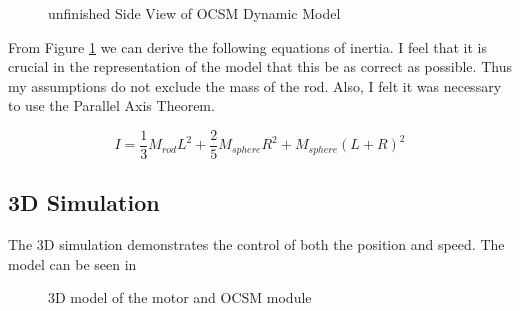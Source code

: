 \begin{figure}[H]
\centering
{}
\caption{\label{fig:dynamic_side} unfinished Side View of OCSM Dynamic Model}
\end{figure}

From Figure {\ref{fig:dynamic_side}} we can derive the following equations of inertia. I feel that it is crucial in the representation of the model that this be as correct as possible. Thus my assumptions do not exclude the mass of the rod. Also, I felt it was necessary to use the Parallel Axis Theorem.

\begin{equation}
 I = \frac{1}{3}M_{rod}L^{2}+\frac{2}{5}M_{sphere}R^{2}+M_{sphere}(L+R)^{2}
\end{equation}
\subsection{3D Simulation}
The 3D simulation demonstrates the control of both the position and speed. The model can be seen in 

\begin{figure}[H]
\centering
{}
\caption{\label{fig:position_4} 3D model of the motor and OCSM module}
\end{figure}
\vspace{5cm}


